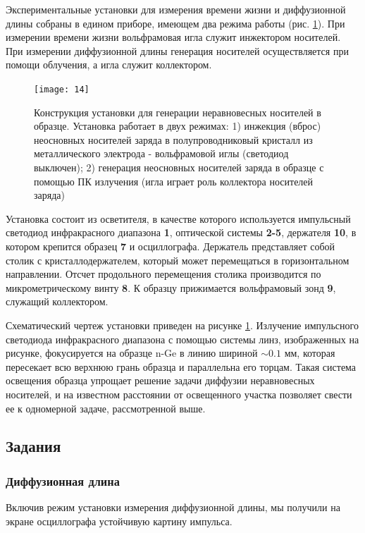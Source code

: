 \documentclass[a4paper,14pt]{extarticle}
\begin{document}
Экспериментальные установки для измерения времени жизни и диффузионной длины собраны в едином приборе, имеющем два режима работы (рис.  \ref{fig:figure13}). При измерении времени жизни вольфрамовая игла служит инжектором носителей. При измерении диффузионной длины генерация носителей осуществляется при помощи облучения, а игла служит коллектором.
\begin{figure}[H]
	\centering
	\texttt{[image: 14]}
	\caption{Конструкция установки для генерации неравновесных носителей в образце. Установка работает в двух режимах: 1) инжекция (вброс) неосновных носителей заряда в полупроводниковый кристалл из металлического электрода - вольфрамовой иглы (светодиод выключен); 2) генерация неосновных носителей заряда в образце с помощью ПК излучения (игла играет роль коллектора носителей заряда)
}
	\label{fig:figure13}
\end{figure}


Установка состоит из осветителя, в качестве которого используется импульсный светодиод инфракрасного диапазона \textbf{1}, оптической системы \textbf{2-5}, держателя \textbf{10}, в котором крепится образец \textbf{7} и осциллографа. Держатель представляет собой столик с кристаллодержателем, который может перемещаться в горизонтальном направлении. Отсчет продольного перемещения столика производится по микрометрическому винту \textbf{8}. К образцу прижимается вольфрамовый зонд \textbf{9}, служащий коллектором.

Схематический чертеж установки приведен на рисунке \ref{fig:figure13}. Излучение импульсного светодиода инфракрасного диапазона с помощью системы линз, изображенных на рисунке, фокусируется на образце n-Ge в линию шириной $\sim0.1$ мм, которая пересекает всю верхнюю грань образца и параллельна его торцам. Такая система освещения образца упрощает решение задачи диффузии неравновесных носителей, и на известном расстоянии от освещенного участка позволяет свести ее к одномерной задаче, рассмотренной выше.

\subsection{Задания}
\subsubsection{Диффузионная длина}

Включив режим установки измерения диффузионной длины, мы получили на экране осциллографа устойчивую картину импульса. 
\end{document}
